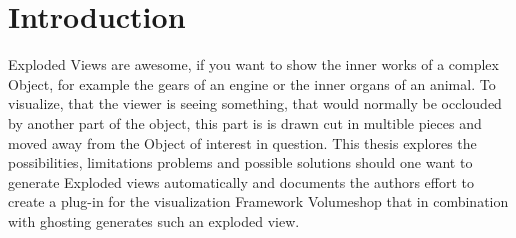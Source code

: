 \chapter{Introduction}
Exploded Views are awesome, if you want to show the inner works of a complex Object, for example the gears of an engine or the inner organs of an animal. To visualize, that the viewer is seeing something, that would normally be occlouded by another part of the object, this part is is drawn cut in multible pieces and moved away from the Object of interest in question. 
This thesis explores the possibilities, limitations problems and possible solutions should one want to generate Exploded views automatically and documents the authors effort to create a plug-in for the visualization Framework Volumeshop that in combination with ghosting generates such an exploded view.